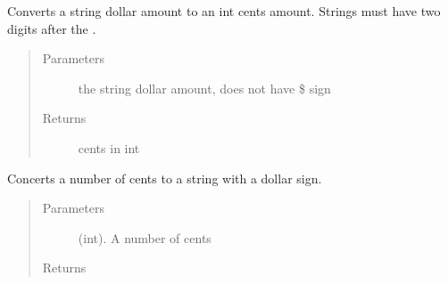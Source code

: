 \documentclass[letterpaper,10pt,english]{sphinxmanual}
\begin{document}

\begin{fulllineitems}
\label{\detokenize{apidoc/utdesign_procurement:utdesign_procurement.utils.convertToCents}}
Converts a string dollar amount to an int cents amount.
Strings must have two digits after the .
\begin{quote}\begin{description}
\item[{Parameters}] \leavevmode
{} \textendash{} the string dollar amount, does not have \$ sign

\item[{Returns}] \leavevmode
cents in int

\end{description}\end{quote}

\end{fulllineitems}


\begin{fulllineitems}
\label{\detokenize{apidoc/utdesign_procurement:utdesign_procurement.utils.convertToDollarStr}}
Concerts a number of cents to a string with a dollar sign.
\begin{quote}\begin{description}
\item[{Parameters}] \leavevmode
{} \textendash{} (int). A number of cents

\item[{Returns}] \leavevmode


\end{description}\end{quote}

\end{fulllineitems}

\end{document}
